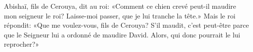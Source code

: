 Abishaï, fils de Cerouya, dit au roi:
	«Comment ce chien crevé peut-il maudire mon seigneur le roi?
	Laisse-moi passer, que je lui tranche la tête.»
Mais le roi répondit:
	«Que me voulez-vous, fils de Cerouya?
	S’il maudit, c’est peut-être parce que le Seigneur lui a ordonné de maudire David.
Alors, qui donc pourrait le lui reprocher?»
